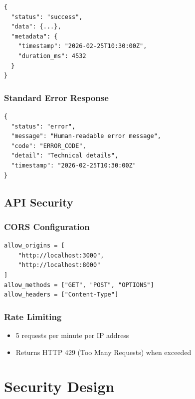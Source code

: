 \documentclass[12pt,a4paper]{report}
\begin{document}
\begin{lstlisting}[style=jsonStyle, caption={Success Response Format}]
{
  "status": "success",
  "data": {...},
  "metadata": {
    "timestamp": "2026-02-25T10:30:00Z",
    "duration_ms": 4532
  }
}
\end{lstlisting}

\subsection{Standard Error Response}

\begin{lstlisting}[style=jsonStyle, caption={Error Response Format}]
{
  "status": "error",
  "message": "Human-readable error message",
  "code": "ERROR_CODE",
  "detail": "Technical details",
  "timestamp": "2026-02-25T10:30:00Z"
}
\end{lstlisting}

\section{API Security}

\subsection{CORS Configuration}

\begin{lstlisting}[style=pythonstyle, caption={CORS Settings}]
allow_origins = [
    "http://localhost:3000",
    "http://localhost:8000"
]
allow_methods = ["GET", "POST", "OPTIONS"]
allow_headers = ["Content-Type"]
\end{lstlisting}

\subsection{Rate Limiting}

\begin{itemize}
    \item 5 requests per minute per IP address
    \item Returns HTTP 429 (Too Many Requests) when exceeded
\end{itemize}

\chapter{Security Design}
\end{document}
